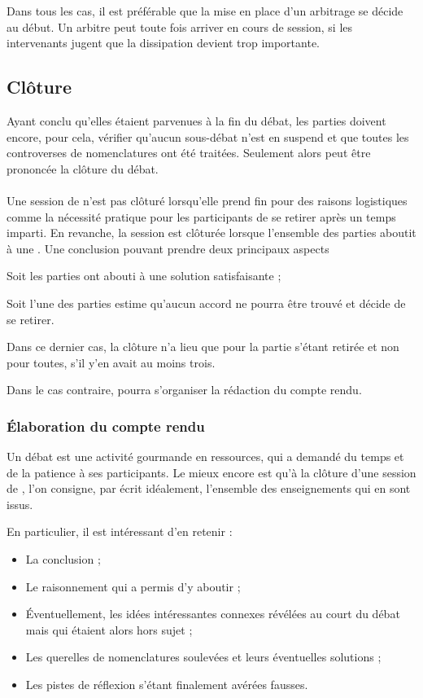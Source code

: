 Dans tous les cas, il est préférable que la mise en place d’un arbitrage se décide au début. Un arbitre peut toute fois arriver en cours de session, si les intervenants jugent que la dissipation devient trop importante.

\subsection{Clôture}

Ayant conclu qu’elles étaient parvenues à la fin du débat, les parties doivent encore, pour cela, vérifier qu’aucun sous-débat n’est en suspend et que toutes les controverses de nomenclatures ont été traitées. Seulement alors peut être prononcée la clôture du débat.

\paragraph{}
Une session de \mainabbr{} n’est pas clôturé lorsqu’elle prend fin pour des raisons logistiques comme la nécessité pratique pour les participants de se retirer après un temps imparti. En revanche, la session est clôturée lorsque l’ensemble des parties aboutit à une . Une conclusion pouvant prendre deux principaux aspects
\begin{SRlist}
  \item Soit les parties ont abouti à une solution satisfaisante ;
  \item Soit l’une des parties estime qu’aucun accord ne pourra être trouvé et décide de se retirer.
\end{SRlist}
Dans ce dernier cas, la clôture n’a lieu que pour la partie s’étant retirée et non pour toutes, s’il y’en avait au moins trois.

Dans le cas contraire, pourra s’organiser la rédaction du compte rendu.

\subsubsection{Élaboration du compte rendu}
Un débat est une activité gourmande en ressources, qui a demandé du temps et de la patience à ses participants. Le mieux encore est qu’à la clôture d’une session de \mainabbr{}, l’on consigne, par écrit idéalement, l’ensemble des enseignements qui en sont issus.

En particulier, il est intéressant d’en retenir :
\begin{itemize}
   \item La conclusion ;
   \item Le raisonnement qui a permis d’y aboutir ;
   \item Éventuellement, les idées intéressantes connexes révélées au court du débat mais qui étaient alors hors sujet ;
   \item Les querelles de nomenclatures soulevées et leurs éventuelles solutions ;
   \item Les pistes de réflexion s’étant finalement avérées fausses.
\end{itemize}

